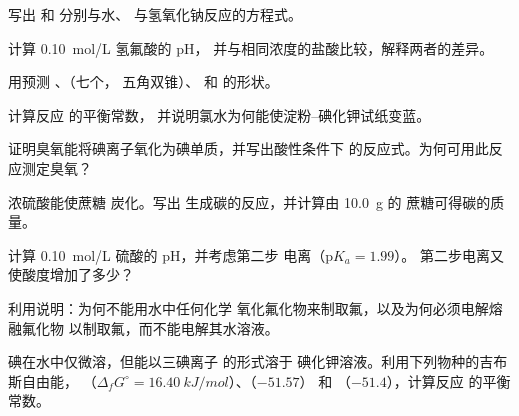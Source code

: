 \begin{exercise}[$\star$]\label{exo:b1:p-block-16-18:4}
写出  和  分别与水、
与氢氧化钠反应的方程式。
\end{exercise}

\begin{exercise}[$\star\star$]\label{exo:b1:p-block-16-18:5}
计算 \qty{0.10}{mol/L} 氢氟酸的 pH，
并与相同浓度的盐酸比较，解释两者的差异。
\end{exercise}

\begin{exercise}[$\star\star$]\label{exo:b1:p-block-16-18:6}
用预测 、（七个，
五角双锥）、 和  的形状。
\end{exercise}

\begin{exercise}[$\star\star$]\label{exo:b1:p-block-16-18:7}
计算反应  的平衡常数，
并说明氯水为何能使淀粉–碘化钾试纸变蓝。
\end{exercise}

\begin{exercise}[$\star\star$]\label{exo:b1:p-block-16-18:8}
证明臭氧能将碘离子氧化为碘单质，并写出酸性条件下
的反应式。为何可用此反应测定臭氧？
\end{exercise}

\begin{exercise}[$\star\star$]\label{exo:b1:p-block-16-18:9}
浓硫酸能使蔗糖  炭化。写出
生成碳的反应，并计算由 \qty{10.0}{g} 的
蔗糖可得碳的质量。
\end{exercise}

\begin{exercise}[$\star\star\star$]\label{exo:b1:p-block-16-18:10}
计算 \qty{0.10}{mol/L} 硫酸的 pH，并考虑第二步
电离（$\mathrm{p}K_a = 1.99$）。
第二步电离又使酸度增加了多少？
\end{exercise}

\begin{exercise}[$\star\star\star$]\label{exo:b1:p-block-16-18:11}
利用说明：为何不能用水中任何化学
氧化氟化物来制取氟，以及为何必须电解熔融氟化物
以制取氟，而不能电解其水溶液。
\end{exercise}

\begin{exercise}[$\star\star\star$]\label{exo:b1:p-block-16-18:12}
碘在水中仅微溶，但能以三碘离子  的形式溶于
碘化钾溶液。利用下列物种的吉布斯自由能，
（$\Delta_f G^\circ = \qty{16.40}{kJ/mol}$）、（$-51.57$）
和 （$-51.4$），计算反应  的平衡常数。
\end{exercise}

